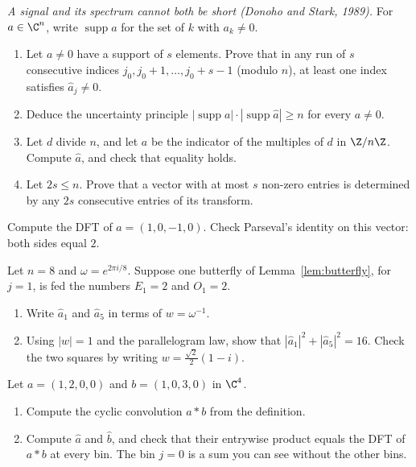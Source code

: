 \begin{exercise}[$\star\star\star$]\label{ex:uncertainty}
\emph{A signal and its spectrum cannot both be short (Donoho and Stark, 1989).} For $a\in\C^n$, write $\operatorname{supp}a$ for the set of $k$ with $a_k\ne0$.
\begin{enumerate}[label=(\alph*)]
\item Let $a\ne0$ have a support of $s$ elements. Prove that in any run of $s$ consecutive indices $j_0,j_0+1,\dots,j_0+s-1$ (modulo $n$), at least one index satisfies $\hat a_j\ne0$.
\item Deduce the uncertainty principle $|\operatorname{supp}a|\cdot|\operatorname{supp}\hat a|\ge n$ for every $a\ne0$.
\item Let $d$ divide $n$, and let $a$ be the indicator of the multiples of $d$ in $\Z/n\Z$. Compute $\hat a$, and check that equality holds.
\item Let $2s\le n$. Prove that a vector with at most $s$ non-zero entries is determined by any $2s$ consecutive entries of its transform.
\end{enumerate}
\end{exercise}

\begin{exercise}[$\star$]\label{ex:rw07a}
Compute the DFT of $a=(1,0,-1,0)$. Check Parseval's identity on this vector: both sides equal $2$.
\end{exercise}

\begin{exercise}[$\star\star$]\label{ex:rw07b}
Let $n=8$ and $\omega=e^{2\pi i/8}$. Suppose one butterfly of Lemma~\ref{lem:butterfly}, for $j=1$, is fed the numbers $E_1=2$ and $O_1=2$.
\begin{enumerate}[label=(\alph*)]
\item Write $\hat a_1$ and $\hat a_5$ in terms of $w=\omega^{-1}$.
\item Using $|w|=1$ and the parallelogram law, show that $|\hat a_1|^2+|\hat a_5|^2=16$. Check the two squares by writing $w=\frac{\sqrt2}2(1-i)$.
\end{enumerate}
\end{exercise}

\begin{exercise}[$\star\star$]\label{ex:rw07c}
Let $a=(1,2,0,0)$ and $b=(1,0,3,0)$ in $\C^4$.
\begin{enumerate}[label=(\alph*)]
\item Compute the cyclic convolution $a*b$ from the definition.
\item Compute $\hat a$ and $\hat b$, and check that their entrywise product equals the DFT of $a*b$ at every bin. The bin $j=0$ is a sum you can see without the other bins.
\end{enumerate}
\end{exercise}

